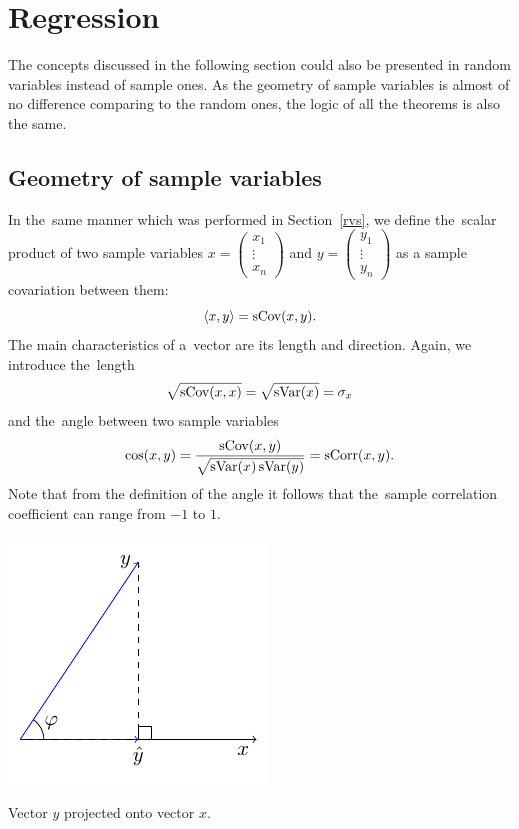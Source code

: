 \section{Regression}

The concepts discussed in the following section could also be presented in
random variables instead of sample ones. As the geometry of sample variables
is almost of no difference comparing to the random ones, the logic of
all the theorems is also the same.


\subsection{Geometry of sample variables}


In the~same manner which was performed in Section~\ref{rvs}, we define
the~scalar product of two sample variables
$x =
\begin{pmatrix}
x_1 \\
\vdots \\
x_n
\end{pmatrix}$
and
$y =
\begin{pmatrix}
y_1 \\
\vdots \\
y_n
\end{pmatrix}$
as a sample covariation between them:
\[
\langle x, y \rangle = \operatorname{sCov}(x, y).
\]
The main characteristics of a~vector are its length and direction.
Again, we introduce the~length
\[
\sqrt{\operatorname{sCov}(x,x)} = \sqrt{\operatorname{sVar}(x)} = \sigma_x
\]
and the~angle between two sample variables
\[
\cos(x,y) = \frac{\operatorname{sCov}(x,y)}{\sqrt{\operatorname{sVar}(x)\operatorname{sVar}(y)}} = \operatorname{sCorr}(x,y).
\]
Note that from the definition of the angle
it follows that the~sample correlation coefficient can range from $-1$ to $1$.

\begin{marginfigure}
\includegraphics[scale=0.85]{figures/02_basic_projection.pdf}
\caption{Vector $y$ projected onto vector $x$.}
\label{fig:corr_proj}
\end{marginfigure}

